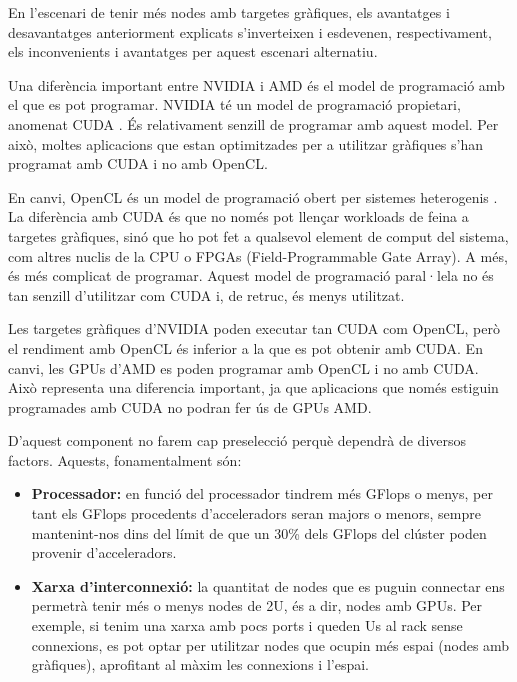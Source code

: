 En l'escenari de tenir més nodes amb targetes gràfiques, els avantatges i desavantatges anteriorment explicats s'inverteixen i esdevenen, respectivament, els inconvenients i avantatges per aquest escenari alternatiu.

Una diferència important entre NVIDIA i AMD és el model de programació amb el que es pot programar. NVIDIA té un model de programació propietari, anomenat CUDA \cite{gpu_cuda}. És relativament senzill de programar amb aquest model. Per això, moltes aplicacions que estan optimitzades per a utilitzar gràfiques s'han programat amb CUDA i no amb OpenCL.

En canvi, OpenCL és un model de programació obert per sistemes heterogenis \cite{gpu_opencl}. La diferència amb CUDA és que no només pot llençar workloads de feina a targetes gràfiques, sinó que ho pot fet a qualsevol element de comput del sistema, com altres nuclis de la CPU o FPGAs (Field-Programmable Gate Array). A més, és més complicat de programar. %
Aquest model de programació paral·lela no és tan senzill d'utilitzar com CUDA i, de retruc, és menys utilitzat.

Les targetes gràfiques d'NVIDIA poden executar tan CUDA com OpenCL, però el rendiment amb OpenCL és inferior a la que es pot obtenir amb CUDA. En canvi, les GPUs d'AMD es poden programar amb OpenCL i no amb CUDA. 
Això representa una diferencia important, ja que aplicacions que només estiguin programades amb CUDA no podran fer ús de GPUs AMD.

D'aquest component no farem cap preselecció perquè dependrà de diversos factors. Aquests, fonamentalment són: 
\begin{itemize}
    \item \textbf{Processador:} en funció del processador tindrem més GFlops o menys, per tant els GFlops procedents d'acceleradors seran majors o menors, sempre mantenint-nos dins del límit de que un 30\% dels GFlops del clúster poden provenir d'acceleradors.
    \item \textbf{Xarxa d'interconnexió:} la quantitat de nodes que es puguin connectar ens permetrà tenir més o menys nodes de 2U, és a dir, nodes amb GPUs. Per exemple, si tenim una xarxa amb pocs ports i queden Us al rack sense connexions, es pot optar per utilitzar nodes que ocupin més espai (nodes amb gràfiques), aprofitant al màxim les connexions i l'espai.
\end{itemize}


